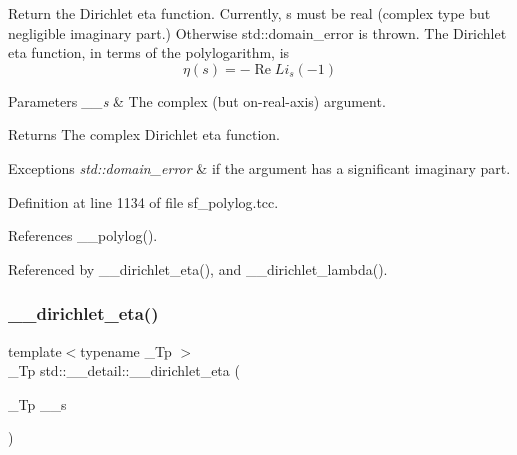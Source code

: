 Return the Dirichlet eta function. Currently, s must be real (complex type but negligible imaginary part.) Otherwise std\+::domain\+\_\+error is thrown. The Dirichlet eta function, in terms of the polylogarithm, is \[ \renewcommand\Re{\operatorname{Re}} \renewcommand\Im{\operatorname{Im}} \eta(s) = -\Re{Li_s(-1)} \]


\begin{DoxyParams}{Parameters}
{\em \+\_\+\+\_\+s} & The complex (but on-\/real-\/axis) argument. \\
\hline
\end{DoxyParams}
\begin{DoxyReturn}{Returns}
The complex Dirichlet eta function. 
\end{DoxyReturn}

\begin{DoxyExceptions}{Exceptions}
{\em std\+::domain\+\_\+error} & if the argument has a significant imaginary part. \\
\hline
\end{DoxyExceptions}


Definition at line 1134 of file sf\+\_\+polylog.\+tcc.



References \+\_\+\+\_\+polylog().



Referenced by \+\_\+\+\_\+dirichlet\+\_\+eta(), and \+\_\+\+\_\+dirichlet\+\_\+lambda().

\mbox{\label{namespacestd_1_1____detail_a88be5bbcdf85bbc487b6b86b5cb65d98}} 
\subsubsection{\texorpdfstring{\+\_\+\+\_\+dirichlet\+\_\+eta()}{\_\_dirichlet\_eta()}\hspace{0.1cm}{\footnotesize\ttfamily [2/2]}}
{\footnotesize\ttfamily template$<$typename \+\_\+\+Tp $>$ \\
\+\_\+\+Tp std\+::\+\_\+\+\_\+detail\+::\+\_\+\+\_\+dirichlet\+\_\+eta (\begin{DoxyParamCaption}\item[{\+\_\+\+Tp}]{\+\_\+\+\_\+s }\end{DoxyParamCaption})}

